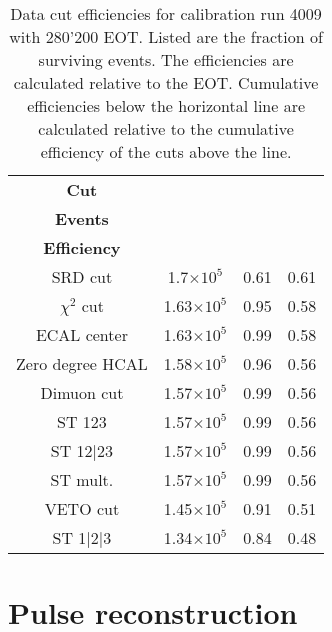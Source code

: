 \begin{table}[htbp]
	\centering
	\caption[Data cut efficiencies for calibration run 4009.]{Data cut efficiencies for calibration run 4009 with 280'200 EOT. Listed are the fraction of surviving events. The efficiencies are calculated relative to the EOT. Cumulative efficiencies below the horizontal line are calculated relative to the cumulative efficiency of the cuts above the line.}
	\begin{tabular}{|cccc|}
		\toprule
		\textbf{Cut} & \thead{\textbf{Surviving}\\\textbf{Events}} & \thead{\textbf{Efficiency}}& \thead{\textbf{Cumulative}\\\textbf{Efficiency}}\\
		\midrule
		SRD cut & 1.7$\times 10^5$ & 0.61 & 0.61\\
		$\chi^2$ cut & 1.63$\times 10^5$ & 0.95 & 0.58\\
		ECAL center & 1.63$\times 10^5$ & 0.99 & 0.58\\
		Zero degree HCAL & 1.58$\times 10^5$ & 0.96 & 0.56\\
		Dimuon cut & 1.57$\times 10^5$ & 0.99 & 0.56\\
		\midrule
		ST 123 & 1.57$\times 10^5$ & 0.99 & 0.56\\
		ST 12|23 & 1.57$\times 10^5$ & 0.99 & 0.56\\
		ST mult. & 1.57$\times 10^5$ & 0.99 & 0.56\\ 
		VETO cut  & 1.45$\times 10^5$ & 0.91 & 0.51\\
		ST 1|2|3 & 1.34$\times 10^5$ & 0.84 & 0.48\\
		\bottomrule
	\end{tabular}
	\label{res:Tab:event_selection}
\end{table}

\iffalse
\begin{table}[bth!]
  \centering
  \begin{tabular}{|lrr|}
    &&
  \end{tabular}
  \caption[efficiency cuts invisible mode]{efficiency and uncertainty for the cut in the invisible mode of 2018}
  \label{tab:inv-cut-eff}
\end{table}
\fi

\section{Pulse reconstruction}
\label{sec:pulse-reconstruction}

